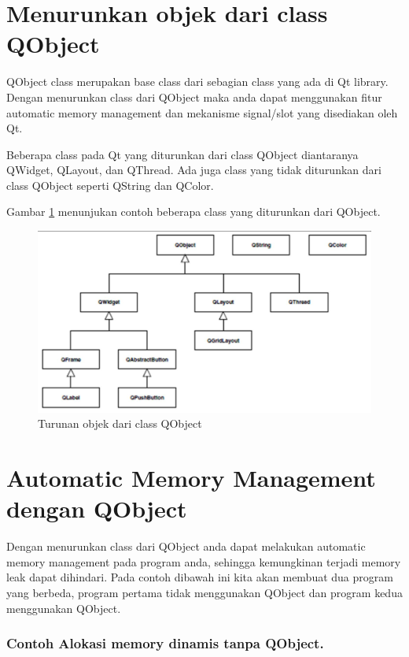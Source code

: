\section{Menurunkan objek dari class QObject}\label{menurunkan-objek-dari-class-qobject}

QObject class merupakan base class dari sebagian class yang ada di Qt
library. Dengan menurunkan class dari QObject maka anda dapat
menggunakan fitur automatic memory management dan mekanisme signal/slot
yang disediakan oleh Qt.

Beberapa class pada Qt yang diturunkan dari class QObject diantaranya
QWidget, QLayout, dan QThread.
Ada juga class yang tidak diturunkan dari
class QObject seperti QString dan QColor.

Gambar \ref{fig:qobjek} menunjukan contoh beberapa class yang diturunkan dari
QObject.

\begin{figure}
\centering
\includegraphics[width=0.9\linewidth]{../manuscript/images/Qobjek}
\caption{Turunan objek dari class QObject}
\label{fig:qobjek}
\end{figure}


\section{Automatic Memory Management dengan QObject}\label{automatic-memory-management-dengan-qobject}

Dengan menurunkan class dari QObject anda dapat melakukan automatic
memory management pada program anda, sehingga kemungkinan terjadi memory
leak dapat dihindari. Pada contoh dibawah ini kita akan membuat dua
program yang berbeda, program pertama tidak menggunakan QObject dan
program kedua menggunakan QObject.

\subsubsection*{Contoh  Alokasi memory dinamis tanpa QObject.}

